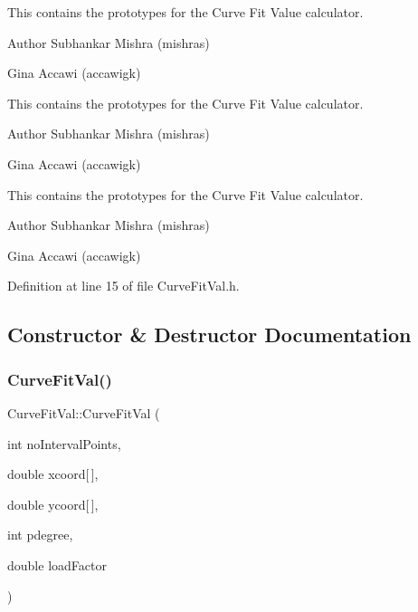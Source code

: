 This contains the prototypes for the Curve Fit Value calculator.

\begin{DoxyAuthor}{Author}
Subhankar Mishra (mishras) 

Gina Accawi (accawigk) 
\end{DoxyAuthor}


This contains the prototypes for the Curve Fit Value calculator.

\begin{DoxyAuthor}{Author}
Subhankar Mishra (mishras) 

Gina Accawi (accawigk) 
\end{DoxyAuthor}


This contains the prototypes for the Curve Fit Value calculator.

\begin{DoxyAuthor}{Author}
Subhankar Mishra (mishras) 

Gina Accawi (accawigk) 
\end{DoxyAuthor}


Definition at line 15 of file Curve\+Fit\+Val.\+h.



\subsection{Constructor \& Destructor Documentation}
\mbox{\label{class_curve_fit_val_a3f15488dbd91b1e4b8c950071402811c}} 
\subsubsection{\texorpdfstring{Curve\+Fit\+Val()}{CurveFitVal()}\hspace{0.1cm}{\footnotesize\ttfamily [1/3]}}
{\footnotesize\ttfamily Curve\+Fit\+Val\+::\+Curve\+Fit\+Val (\begin{DoxyParamCaption}\item[{int}]{no\+Interval\+Points,  }\item[{double}]{xcoord\mbox{[}$\,$\mbox{]},  }\item[{double}]{ycoord\mbox{[}$\,$\mbox{]},  }\item[{int}]{pdegree,  }\item[{double}]{load\+Factor }\end{DoxyParamCaption})\hspace{0.3cm}{\ttfamily [inline]}}

